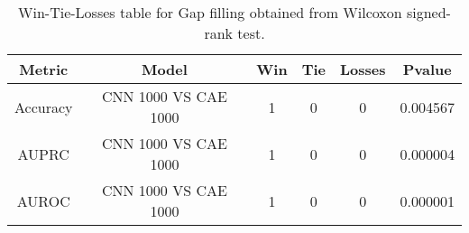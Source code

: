 \begin{table}[H]
\centering
\begin{tabular}{|c|c|c|c|c|c|}

\textbf{Metric} &        \textbf{Model} &  \textbf{Win} &  \textbf{Tie} &  \textbf{Losses} &  \textbf{Pvalue} \\
\hline

       Accuracy &  CNN 1000 VS CAE 1000 &             1 &             0 &                0 &         0.004567 \\
\hline
          AUPRC &  CNN 1000 VS CAE 1000 &             1 &             0 &                0 &         0.000004 \\
\hline
          AUROC &  CNN 1000 VS CAE 1000 &             1 &             0 &                0 &         0.000001 \\
\hline

\end{tabular}
\caption{Win-Tie-Losses table for Gap filling obtained from Wilcoxon signed-rank test.}
\label{tab:gap_filling_best_models_comparison}
\end{table}